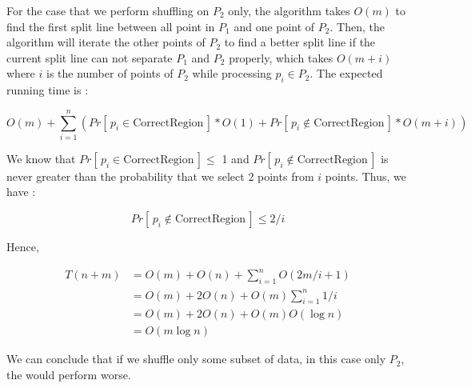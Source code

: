 For the case that we perform shuffling on $P_2$ only, the algorithm takes $O(m)$
to find the first split line between all point in $P_1$ and one point of $P_2$.
Then, the algorithm will iterate the other points of $P_2$ to find a better split
line if the current split line can not separate $P_1$ and $P_2$ properly, which
takes $O(m+i)$ where $i$ is the number of points of $P_2$ while processing $p_i
\in P_2$. The expected running time is :

$$
O(m) + \sum_{i=1}^{n}{ ( Pr[\,p_i \in \text{CorrectRegion}\,]*O(1) 
    + Pr[\,p_i \not\in \text{CorrectRegion}\,]*O(m+i)
) }
$$

We know that $Pr[\,p_i \in \text{CorrectRegion}\,] \le$ 1 and $Pr[\,p_i \not\in \text{CorrectRegion}\,]$
is never greater than the probability that we select 2 points from $i$ points. Thus,
we have :

$$
Pr[\,p_i \not\in \text{CorrectRegion}\,] \le 2/i
$$

Hence,

\begin{align*}
T(n+m) &= O(m) + O(n) + \sum_{i=1}^{n}O(2m/i+1) \\
&= O(m) + 2O(n) + O(m)\sum_{i=1}^{n}1/i \\
&= O(m) + 2O(n) + O(m)O(\log{n}) \\
&= O(m\log{n})
\end{align*}

We can conclude that if we shuffle only some subset of data, in this case only $P_2$, the
would perform worse.
